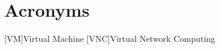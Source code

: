 \chapter*{Acronyms}
\begin{acronym}
[VM]{Virtual Machine}
[VNC]{Virtual Network Computing}
\end{acronym}

